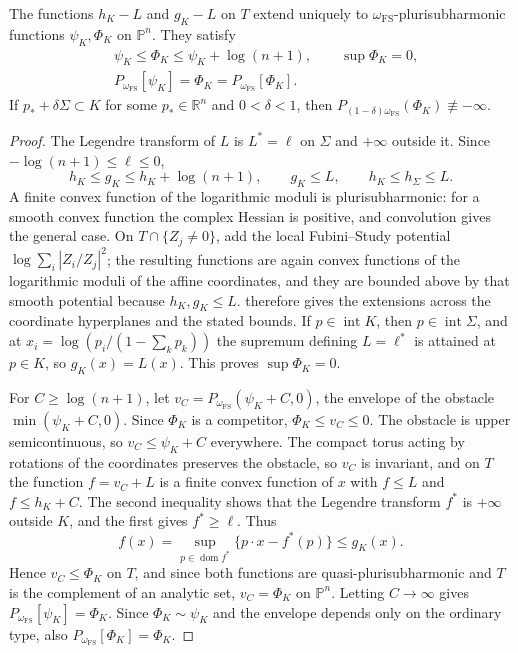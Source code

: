 \begin{lemma}\label{lem:convex-body-model}
The functions $h_K-L$ and $g_K-L$ on $T$ extend uniquely to $\omega_{\mathrm{FS}}$-plurisubharmonic functions $\psi_K,\Phi_K$ on $\mathbb P^n$. They satisfy
\[
 \begin{aligned}
  &\psi_K\leq\Phi_K\leq\psi_K+\log(n+1),\qquad\sup\Phi_K=0,\\
  &P_{\omega_{\mathrm{FS}}}[\psi_K]=\Phi_K
       =P_{\omega_{\mathrm{FS}}}[\Phi_K].
 \end{aligned}
\]
If $p_*+\delta\Sigma\subset K$ for some $p_*\in\mathbb R^n$ and $0<\delta<1$, then $P_{(1-\delta)\omega_{\mathrm{FS}}}(\Phi_K)\not\equiv-\infty$.
\end{lemma}
\begin{proof}
The Legendre transform of $L$ is $L^*=\ell$ on $\Sigma$ and $+\infty$ outside it. Since $-\log(n+1)\leq\ell\leq0$,
\[
 h_K\leq g_K\leq h_K+\log(n+1),\qquad
 g_K\leq L,\qquad h_K\leq h_\Sigma\leq L.
\]
A finite convex function of the logarithmic moduli is plurisubharmonic: for a smooth convex function the complex Hessian is positive, and convolution gives the general case. On $T\cap\{Z_j\ne0\}$, add the local Fubini--Study potential $\log\sum_i|Z_i/Z_j|^2$; the resulting functions are again convex functions of the logarithmic moduli of the affine coordinates, and they are bounded above by that smooth potential because $h_K,g_K\leq L$.  therefore gives the extensions across the coordinate hyperplanes and the stated bounds. If $p\in\operatorname{int}K$, then $p\in\operatorname{int}\Sigma$, and at $x_i=\log(p_i/(1-\sum_k p_k))$ the supremum defining $L=\ell^*$ is attained at $p\in K$, so $g_K(x)=L(x)$. This proves $\sup\Phi_K=0$.

For $C\geq\log(n+1)$, let $v_C=P_{\omega_{\mathrm{FS}}}(\psi_K+C,0)$, the envelope of the obstacle $\min(\psi_K+C,0)$. Since $\Phi_K$ is a competitor, $\Phi_K\leq v_C\leq0$. The obstacle is upper semicontinuous, so $v_C\leq\psi_K+C$ everywhere. The compact torus acting by rotations of the coordinates preserves the obstacle, so $v_C$ is invariant, and on $T$ the function $f=v_C+L$ is a finite convex function of $x$ with $f\leq L$ and $f\leq h_K+C$. The second inequality shows that the Legendre transform $f^*$ is $+\infty$ outside $K$, and the first gives $f^*\geq\ell$. Thus
\[
 f(x)=\sup_{p\in\operatorname{dom}f^*}\{p\cdot x-f^*(p)\}
       \leq g_K(x).
\]
Hence $v_C\leq\Phi_K$ on $T$, and since both functions are quasi-plurisubharmonic and $T$ is the complement of an analytic set, $v_C=\Phi_K$ on $\mathbb P^n$. Letting $C\to\infty$ gives $P_{\omega_{\mathrm{FS}}}[\psi_K]=\Phi_K$. Since $\Phi_K\sim\psi_K$ and the envelope depends only on the ordinary type, also $P_{\omega_{\mathrm{FS}}}[\Phi_K]=\Phi_K$.


\end{proof}
